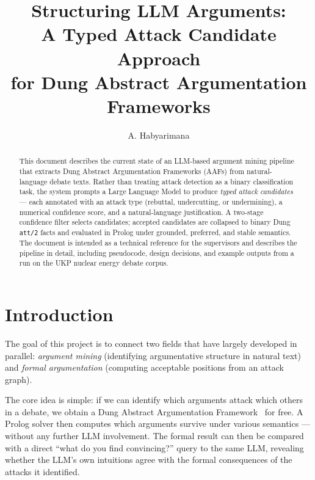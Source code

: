 \documentclass[runningheads]{llncs}
\begin{document}
\title{Structuring LLM Arguments:\\
A Typed Attack Candidate Approach\\
for Dung Abstract Argumentation Frameworks}


\author{A. Habyarimana}

\maketitle

\begin{abstract}
This document describes the current state of an LLM-based argument mining
pipeline that extracts Dung Abstract Argumentation Frameworks (AAFs) from
natural-language debate texts. Rather than treating attack detection as a
binary classification task, the system prompts a Large Language Model to
produce \emph{typed attack candidates} — each annotated with an attack
type (rebuttal, undercutting, or undermining), a numerical confidence
score, and a natural-language justification. A two-stage confidence filter
selects candidates; accepted candidates are collapsed to binary Dung
\texttt{att/2} facts and evaluated in Prolog under grounded, preferred,
and stable semantics. The document is intended as a technical reference
for the supervisors and describes the pipeline in detail, including
pseudocode, design decisions, and example outputs from a run on the UKP
nuclear energy debate corpus.

\end{abstract}

\section{Introduction}

The goal of this project is to connect two fields that have largely
developed in parallel: \emph{argument mining} (identifying argumentative
structure in natural text) and \emph{formal argumentation} (computing
acceptable positions from an attack graph).

The core idea is simple: if we can identify which arguments attack which
others in a debate, we obtain a Dung Abstract Argumentation
Framework~\cite{dung1995} for free. A Prolog solver then computes which
arguments survive under various semantics — without any further LLM
involvement. The formal result can then be compared with a direct
``what do you find convincing?'' query to the same LLM, revealing whether
the LLM's own intuitions agree with the formal consequences of the attacks
it identified.
\end{document}
